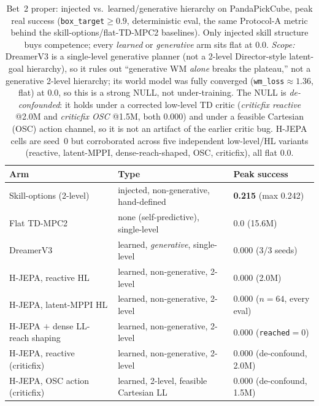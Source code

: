 \documentclass{article}
\begin{document}
\begin{table}[t]
\centering
\caption{Bet~2 proper: injected vs.\ learned/generative hierarchy on
PandaPickCube, peak real success (\texttt{box\_target}$\geq 0.9$, deterministic
eval, the same Protocol-A metric behind the skill-options/flat-TD-MPC2 baselines).
Only injected skill structure buys competence; every \emph{learned} or
\emph{generative} arm sits flat at $0.0$. \emph{Scope:} DreamerV3 is a
single-level generative planner (not a 2-level Director-style latent-goal
hierarchy), so it rules out ``generative WM \emph{alone} breaks the plateau,''
not a generative 2-level hierarchy; its world model was fully converged
(\texttt{wm\_loss}${\approx}1.36$, flat) at $0.0$, so this is a strong NULL, not
under-training. The NULL is \emph{de-confounded}: it holds under a corrected
low-level TD critic (\emph{criticfix reactive} @2.0M and \emph{criticfix OSC}
@1.5M, both $0.000$) and under a feasible Cartesian (OSC) action channel, so it is
not an artifact of the earlier critic bug. H-JEPA cells are seed~0 but corroborated
across five independent low-level/HL variants (reactive, latent-MPPI,
dense-reach-shaped, OSC, criticfix), all flat $0.0$.}
\label{tab:bet2null}
\begin{tabular}{lll}
\toprule
Arm & Type & Peak success \\
\midrule
Skill-options (2-level)        & injected, non-generative, hand-defined & \textbf{0.215} (max 0.242) \\
Flat TD-MPC2                   & none (self-predictive), single-level & $0.0$ (15.6M) \\
DreamerV3                      & learned, \emph{generative}, single-level & $0.000$ (3/3 seeds) \\
H-JEPA, reactive HL            & learned, non-generative, 2-level & $0.000$ (2.0M) \\
H-JEPA, latent-MPPI HL         & learned, non-generative, 2-level & $0.000$ ($n{=}64$, every eval) \\
H-JEPA $+$ dense LL-reach shaping & learned, non-generative, 2-level & $0.000$ (\texttt{reached}$=0$) \\
H-JEPA, reactive (criticfix)   & learned, non-generative, 2-level & $0.000$ (de-confound, 2.0M) \\
H-JEPA, OSC action (criticfix) & learned, 2-level, feasible Cartesian LL & $0.000$ (de-confound, 1.5M) \\
\bottomrule
\end{tabular}
\end{table}
\end{document}
